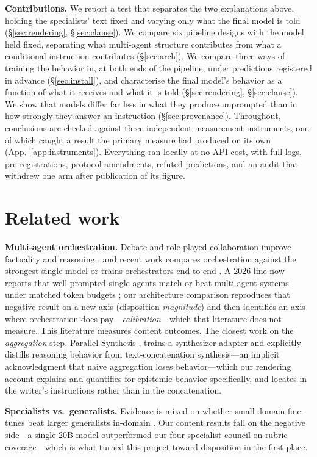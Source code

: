 \documentclass[11pt]{article}
\begin{document}
\textbf{Contributions.} We report a test that separates the two explanations
above, holding the specialists' text fixed and varying only what the final
model is told (\S\ref{sec:rendering}, \S\ref{sec:clause}). We compare six
pipeline designs with the model held fixed, separating what multi-agent
structure contributes from what a conditional instruction contributes
(\S\ref{sec:arch}). We compare three ways of training the behavior in, at both
ends of the pipeline, under predictions registered in advance
(\S\ref{sec:install}), and characterise the final model's behavior as a
function of what it receives and what it is told (\S\ref{sec:rendering},
\S\ref{sec:clause}). We show that models differ far less in what they produce
unprompted than in how strongly they answer an instruction
(\S\ref{sec:provenance}). Throughout, conclusions are checked against three
independent measurement instruments, one of which caught a result the primary
measure had produced on its own (App.~\ref{app:instruments}). Everything ran
locally at no API cost, with full logs, pre-registrations, protocol
amendments, refuted predictions, and an audit that withdrew one arm after
publication of its figure.

\section{Related work}
\textbf{Multi-agent orchestration.} Debate and role-played collaboration improve factuality and reasoning \cite{du2023,moa2024,medagents,mdagents}, and recent work compares orchestration against the strongest single model \cite{tian2025} or trains orchestrators end-to-end \cite{masorchestra}. A 2026 line now reports that well-prompted single agents match or beat multi-agent systems under matched token budgets \cite{singleagent}; our architecture comparison reproduces that negative result on a new axis (disposition \emph{magnitude}) and then identifies an axis where orchestration does pay---\emph{calibration}---which that literature does not measure. This literature measures content outcomes. The closest work on the \emph{aggregation} step, Parallel-Synthesis \cite{parallelsynth}, trains a synthesizer adapter and explicitly distills reasoning behavior from text-concatenation synthesis---an implicit acknowledgment that naive aggregation loses behavior---which our rendering account explains and quantifies for epistemic behavior specifically, and locates in the writer's instructions rather than in the concatenation.

\textbf{Specialists vs.\ generalists.} Evidence is mixed on whether small
domain fine-tunes beat larger generalists in-domain \cite{trident,medftrag}.
Our content results fall on the negative side---a single 20B model outperformed
our four-specialist council on rubric coverage---which is what turned this
project toward disposition in the first place.
\end{document}
